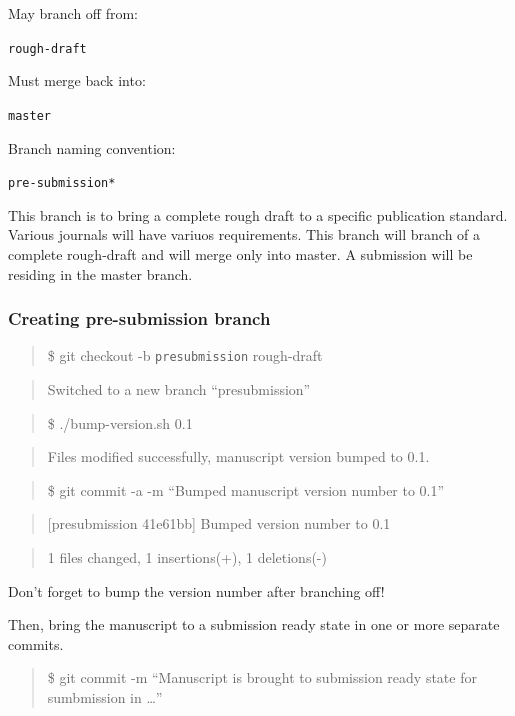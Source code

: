 \documentclass[]{book}
\begin{document}
May branch off from:

\texttt{rough-draft}

Must merge back into:

\texttt{master}

Branch naming convention:

\texttt{pre-submission*}

This branch is to bring a complete rough draft to a specific publication
standard. Various journals will have variuos requirements. This branch
will branch of a complete rough-draft and will merge only into master. A
submission will be residing in the master branch.

\subsubsection{Creating pre-submission
branch}\label{creating-pre-submission-branch}

\begin{quote}
\$ git checkout -b \texttt{presubmission} rough-draft
\end{quote}

\begin{quote}
Switched to a new branch ``presubmission''
\end{quote}

\begin{quote}
\$ ./bump-version.sh 0.1
\end{quote}

\begin{quote}
Files modified successfully, manuscript version bumped to 0.1.
\end{quote}

\begin{quote}
\$ git commit -a -m ``Bumped manuscript version number to 0.1''
\end{quote}

\begin{quote}
{[}presubmission 41e61bb{]} Bumped version number to 0.1
\end{quote}

\begin{quote}
1 files changed, 1 insertions(+), 1 deletions(-)
\end{quote}

Don't forget to bump the version number after branching off!

Then, bring the manuscript to a submission ready state in one or more
separate commits.

\begin{quote}
\$ git commit -m ``Manuscript is brought to submission ready state for
sumbmission in \ldots{}''
\end{quote}
\end{document}
